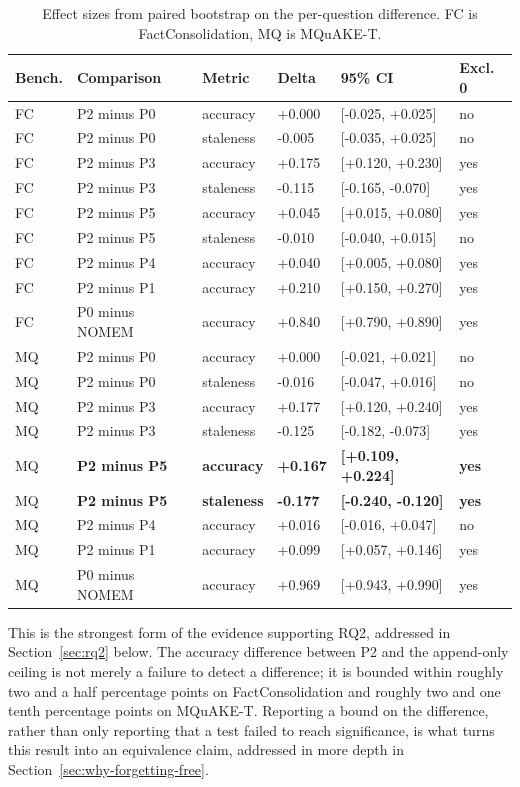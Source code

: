 \begin{table}[H]
\centering
\caption{Effect sizes from paired bootstrap on the per-question difference. FC is FactConsolidation, MQ is MQuAKE-T.}
\label{tab:effect-sizes}
\small
\setlength{\tabcolsep}{4pt}
\begin{tabular}{llllll}
\toprule
Bench. & Comparison & Metric & Delta & 95\% CI & Excl. 0 \\
\midrule
FC & P2 minus P0 & accuracy & +0.000 & [-0.025, +0.025] & no \\
FC & P2 minus P0 & staleness & -0.005 & [-0.035, +0.025] & no \\
FC & P2 minus P3 & accuracy & +0.175 & [+0.120, +0.230] & yes \\
FC & P2 minus P3 & staleness & -0.115 & [-0.165, -0.070] & yes \\
FC & P2 minus P5 & accuracy & +0.045 & [+0.015, +0.080] & yes \\
FC & P2 minus P5 & staleness & -0.010 & [-0.040, +0.015] & no \\
FC & P2 minus P4 & accuracy & +0.040 & [+0.005, +0.080] & yes \\
FC & P2 minus P1 & accuracy & +0.210 & [+0.150, +0.270] & yes \\
FC & P0 minus NOMEM & accuracy & +0.840 & [+0.790, +0.890] & yes \\
MQ & P2 minus P0 & accuracy & +0.000 & [-0.021, +0.021] & no \\
MQ & P2 minus P0 & staleness & -0.016 & [-0.047, +0.016] & no \\
MQ & P2 minus P3 & accuracy & +0.177 & [+0.120, +0.240] & yes \\
MQ & P2 minus P3 & staleness & -0.125 & [-0.182, -0.073] & yes \\
MQ & \textbf{P2 minus P5} & \textbf{accuracy} & \textbf{+0.167} & \textbf{[+0.109, +0.224]} & \textbf{yes} \\
MQ & \textbf{P2 minus P5} & \textbf{staleness} & \textbf{-0.177} & \textbf{[-0.240, -0.120]} & \textbf{yes} \\
MQ & P2 minus P4 & accuracy & +0.016 & [-0.016, +0.047] & no \\
MQ & P2 minus P1 & accuracy & +0.099 & [+0.057, +0.146] & yes \\
MQ & P0 minus NOMEM & accuracy & +0.969 & [+0.943, +0.990] & yes \\
\bottomrule
\end{tabular}
\end{table}

This is the strongest form of the evidence supporting RQ2, addressed in Section~\ref{sec:rq2} below. The accuracy difference between P2 and the append-only ceiling is not merely a failure to detect a difference; it is bounded within roughly two and a half percentage points on FactConsolidation and roughly two and one tenth percentage points on MQuAKE-T. Reporting a bound on the difference, rather than only reporting that a test failed to reach significance, is what turns this result into an equivalence claim, addressed in more depth in Section~\ref{sec:why-forgetting-free}.

